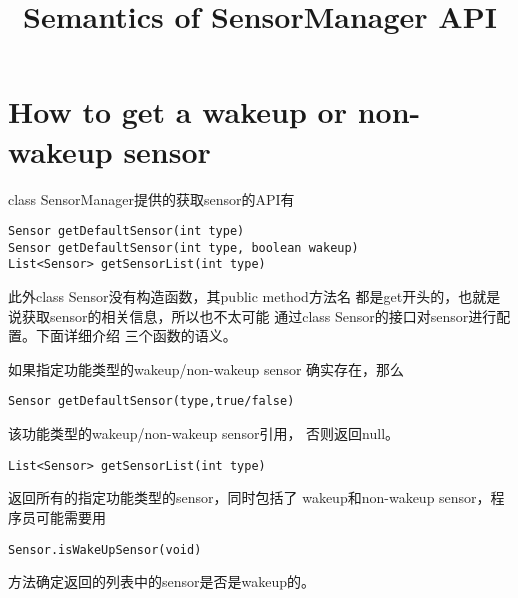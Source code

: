 \documentclass{article}
\title{Semantics of SensorManager API}
\begin{document}
\section{How to get a wakeup or non-wakeup sensor}
class SensorManager提供的获取sensor的API有
\begin{lstlisting}
Sensor getDefaultSensor(int type)
Sensor getDefaultSensor(int type, boolean wakeup)
List<Sensor> getSensorList(int type)
\end{lstlisting}
此外class Sensor没有构造函数，其public method方法名
都是get开头的，也就是说获取sensor的相关信息，所以也不太可能
通过class Sensor的接口对sensor进行配置。下面详细介绍
三个函数的语义。
\par{
如果指定功能类型的wakeup/non-wakeup sensor
确实存在，那么
\begin{lstlisting}
Sensor getDefaultSensor(type,true/false)
\end{lstlisting}
该功能类型的wakeup/non-wakeup sensor引用，
否则返回null。
}
\par{
\begin{lstlisting}
List<Sensor> getSensorList(int type)
\end{lstlisting}
返回所有的指定功能类型的sensor，同时包括了
wakeup和non-wakeup sensor，程序员可能需要用
\begin{lstlisting}
Sensor.isWakeUpSensor(void)
\end{lstlisting}
方法确定返回的列表中的sensor是否是wakeup的。
}
\end{document}
